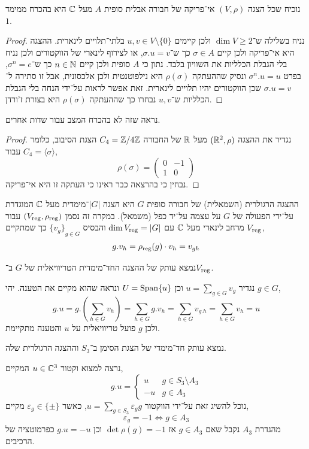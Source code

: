 \question{}
\subquestion{}
נוכיח שכל הצגה $(V, \rho)$ אי־פריקה של חבורה אבלית סופית $A$ מעל $\mathbb{C}$ היא בהכרח ממימד $1$.
\begin{proof}
	נניח בשלילה ש־$\dim V \ge 2$ ולכן קיימים $u, v \in V \setminus \{ 0 \}$ בלתי־תלויים לינארית.
	ההצגה היא אי־פריקה ולכן קיים $\sigma \in A$ כך ש־$\sigma . u = v$, או לצירוף לינארי של הווקטורים ולכן נניח בלי הגבלת הכלליות את השוויון בלבד.
	נתון כי $A$ סופית ולכן קיים $n \in \mathbb{N}$ כך ש־$\sigma^n = e$, בפרט $\sigma^n . u = u$ ונסיק שההעתקה $\rho(\sigma)$ היא נילפוטנטית ולכן אלכסונית, אבל זו סתירה ל־$\sigma . u = v$ שכן הווקטורים יהיו תלויים לינארית.
	זאת אפשר לראות על־ידי הנחה בלי הגבלת הכלליות ש־$u, v$ נבחרו כך שההעתקה $\rho(\sigma)$ היא בצורת ז'ורדן.
\end{proof}

\subquestion{}
נראה שזה לא בהכרח המצב עבור שדות אחרים.
\begin{proof}
	נגדיר את ההצגה $(\mathbb{R}^2, \rho)$ מעל $\mathbb{R}$ של החבורה $C_4 = \mathbb{Z} / 4 \mathbb{Z}$ הצגת הסיבוב, כלומר $C_4 = \langle \sigma \rangle$ עבור,
	\[
		\rho(\sigma)
		= \begin{pmatrix}
			0 & -1 \\
			1 & 0
		\end{pmatrix}
	\]
	נבחין כי בהרצאה כבר ראינו כי העתקה זו היא אי־פריקה.
\end{proof}

\question{}
\begin{definition}
	ההצגה הרגולרית (השמאלית) של חבורה סופית $G$ היא הצגה $|G|$־מימדית מעל $\mathbb{C}$ המוגדרת על־ידי הפעולה של $G$ על עצמה על־יד כפל (משמאל).
	במקרה זה נסמן $(V_{\operatorname{reg}}, \rho_{\operatorname{reg}})$ עבור $V_{\operatorname{reg}}$ מרחב לינארי מעל $\mathbb{C}$ עם $\dim V_{\operatorname{reg}} = |G|$ והבסיס ${\{ v_g \}}_{g \in G}$ כך שמתקיים,
	\[
		g . v_h
		= \rho_{\operatorname{reg}}(g) \cdot v_h
		= v_{g h}
	\]
\end{definition}

\subquestion{}
נמצא עותק של ההצגה החד־מימדית הטריוויאלית של $G$ ב־$V_{\operatorname{reg}}$.
\begin{solution}
	נגדיר $u = \sum_{g \in G} v_g$ וכן $U = \operatorname{Span}\{ u \}$ ונראה שהוא מקיים את הטענה.
	יהי $g \in G$,
	\[
		g . u
		= g . (\sum_{h \in G} v_h)
		= \sum_{h \in G} g . v_h
		= \sum_{h \in G} v_{g . h}
		= \sum_{h \in G} v_h
		= u
	\]
	ולכן $g$ פועל טריוויאלית על $u$ והטענה מתקיימת.
\end{solution}

\subquestion{}
נמצא עותק חד־מימדי של הצגת הסימן ב־$S_3$ וההצגה הרגולרית שלה.
\begin{solution}
	נרצה למצוא וקטור $u \in \mathbb{C}^3$ המקיים,
	\[
		g . u
		= \begin{cases}
			u & g \in S_3 \setminus A_3 \\
			-u & g \in A_3
		\end{cases}
	\]
	נוכל להשיג זאת על־ידי הווקטור $u = \sum_{g \in S_3} \varepsilon_g g$, כאשר $\varepsilon_g \in \{ \pm \}$ מקיים,
	\[
		\varepsilon_g = -1
		\iff g \in A_3
	\]
	מהגדרת $A_3$ נקבל שאם $g \in A_3$ אז $\det \rho(g) = -1$ וכן $g . u = -u$ כפרמוטציה של הרכיבים.
\end{solution}

